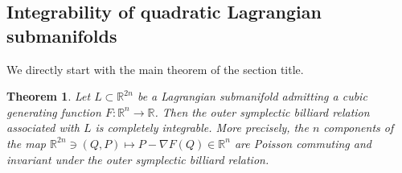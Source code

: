 \documentclass[12pt]{article}
\newtheorem{lemma}{Lemma}[section]
\newtheorem{theorem}{Theorem}
\newcommand{\R}{{\mathbb R}}
\begin{document}

 


\subsection{Integrability of quadratic Lagrangian submanifolds}

We directly start with the main theorem of the section title.

\begin{theorem} \label{thm:int}
Let $L\subset\R^{2n}$ be a Lagrangian submanifold admitting a cubic generating function $F:\R^n\to\R$. Then the outer symplectic billiard relation associated with $L$ is completely integrable. More precisely, the $n$ components of the map $\R^{2n}\ni(Q,P)\mapsto P-\nabla F(Q)\in\R^n$ are Poisson commuting and invariant under the outer symplectic billiard relation.
\end{theorem}
\end{document}
